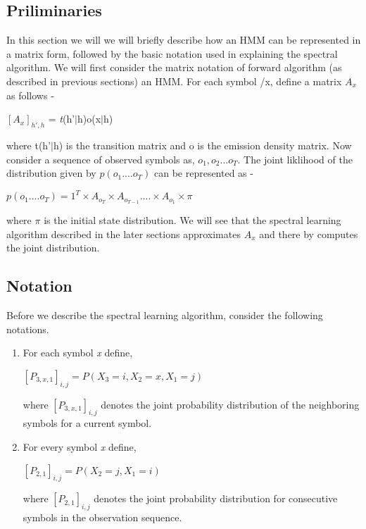 \documentclass{article} %
\begin{document}
\subsection{Priliminaries}
In this section we will we will briefly describe how an HMM can be represented in a matrix form, followed by the basic notation used in explaining the spectral algorithm. 
\newline
We will first consider the matrix notation of forward algorithm (as described in previous sections) an HMM. For each symbol /x, define a matrix $A_x$ as follows -
\begin{center}
$[A_x]_{h',h}$ = \textit{t}(h'$\vert$h)o(x$\vert$h) 

\end{center}
 
where t(h'$\vert$h) is the transition matrix and o is the emission density matrix.
Now consider a sequence of observed symbols as, $o_1,o_2...o_T$. The joint liklihood of the distribution given by $p(o_1....o_T)$ can be represented as -
\begin{center}
$p(o_1....o_T) = 1^T \times A_{o_T} \times A_{o_{T-1}} . . . . \times A_{o_1} \times \pi$
\end{center}
where $\pi$ is the initial state distribution. We will see that the spectral learning algorithm described in the later sections approximates $A_x$ and there by computes the joint distribution.

\subsection{Notation}
Before we describe the spectral learning algorithm, consider the following notations.
\begin{enumerate}
\item For each symbol \textit{x} define, 
\begin{center}
$[P_{3,x,1}]_{i,j} = P(X_3 = i, X_2 = x, X_1 = j)$
\end{center}
where $[P_{3,x,1}]_{i,j}$ denotes the joint probability distribution of the neighboring symbols for a current symbol.
\item For every symbol \textit{x} define,
\begin{center}
$[P_{2,1}]_{i,j} = P(X_2 = j, X_1 = i)$
\end{center}
where $[P_{2,1}]_{i,j}$ denotes the joint probability distribution for consecutive symbols in the observation sequence.
\end{enumerate}
\end{document}
